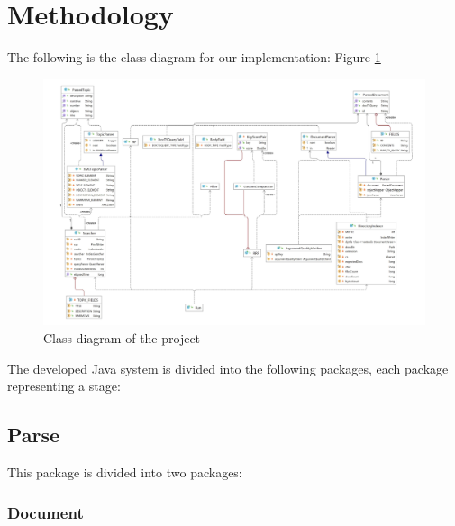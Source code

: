 \section{Methodology}
\label{sec:methodology}


The following is the class diagram for our implementation: Figure \ref{fig:class-diagram}

\begin{figure}[h]
	\centering
	\includegraphics[width=\textwidth]{figure/class-diagram.PNG}
	\caption{Class diagram of the project}
	\label{fig:class-diagram}
\end{figure}

The developed Java system is divided into the following packages, each package representing a stage:


\subsection{Parse}
  
  This package is divided into two packages: 
\subsubsection{Document}
        
